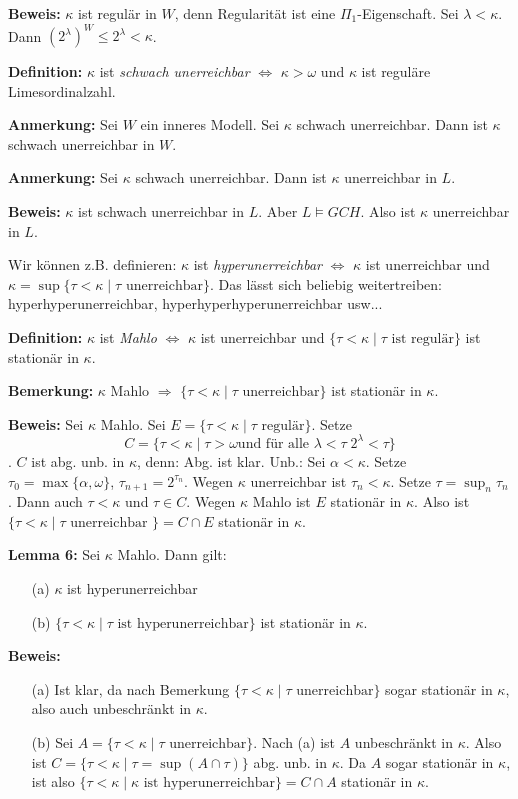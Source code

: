 \documentclass[a4paper,fontsize=11pt]{scrartcl}
\begin{document}
{\bf Beweis:} $\kappa$ ist regulär in $W$, denn Regularität ist eine
$\Pi_1$-Eigenschaft. Sei $\lambda<\kappa$. Dann $(2^{\lambda})^W\le
2^{\lambda}<\kappa$.

{\bf Definition:} $\kappa$ ist \emph{schwach unerreichbar} $\iff$
$\kappa>\omega$ und $\kappa$ ist reguläre Limesordinalzahl.

{\bf Anmerkung:} Sei $W$ ein inneres Modell. Sei $\kappa$ schwach
unerreichbar. Dann ist $\kappa$ schwach unerreichbar in $W$.

{\bf Anmerkung:} Sei $\kappa$ schwach unerreichbar. Dann ist $\kappa$ unerreichbar in $L$.

{\bf Beweis:} $\kappa$ ist schwach unerreichbar in $L$. Aber $L\models
GCH$. Also ist $\kappa$ unerreichbar in $L$.

Wir können z.B. definieren: $\kappa$ ist \emph{hyperunerreichbar}
$\iff$ $\kappa$ ist unerreichbar und $\kappa
=\sup\{\tau<\kappa\mid\tau \mbox{ unerreichbar}\}$. Das lässt sich
beliebig weitertreiben: hyperhyperunerreichbar,
hyperhyperhyperunerreichbar usw...

{\bf Definition:} $\kappa$ ist \emph{Mahlo} $\iff$ $\kappa$ ist
unerreichbar und $\{\tau<\kappa\mid \tau \mbox{ ist regulär}\}$ ist
stationär in $\kappa$.

{\bf Bemerkung:} $\kappa$ Mahlo $\Rightarrow$ $\{ \tau<\kappa\mid \tau\mbox{ unerreichbar}\}$ ist stationär in $\kappa$.

{\bf Beweis:} Sei $\kappa$ Mahlo. Sei $E= \{\tau<\kappa\mid \tau
\mbox{ regulär} \}$. Setze \[C=\{ \tau<\kappa\mid \tau>\omega \mbox{
  und für alle }\lambda<\tau\; 2^{\lambda}<\tau\}\]. $C$ ist
abg. unb. in $\kappa$, denn: Abg. ist klar.  Unb.: Sei
$\alpha<\kappa$.  Setze $\tau_0=\max\{\alpha,\omega\}$,
$\tau_{n+1}=2^{\tau_n}$.  Wegen $\kappa$ unerreichbar ist
$\tau_n<\kappa$.  Setze $\tau=\sup_n\tau_n$.  Dann auch $\tau<\kappa$
und $\tau\in C$.  Wegen $\kappa$ Mahlo ist $E$ stationär in $\kappa$.
Also ist $\{\tau<\kappa\mid \tau\mbox{ unerreichbar }\} = C\cap E$
stationär in $\kappa$.

{\bf Lemma 6:} Sei $\kappa$ Mahlo. Dann gilt: 
\begin{itemize}
\item[(a)] $\kappa$ ist hyperunerreichbar
\item[(b)] $\{\tau<\kappa\mid \tau \mbox{ ist hyperunerreichbar}\}$ ist stationär in $\kappa$.
\end{itemize}

{\bf Beweis:}
\begin{itemize}
\item[(a)] Ist klar, da nach Bemerkung $\{\tau<\kappa\mid \tau\mbox{ unerreichbar}\}$  sogar stationär in $\kappa$, also auch unbeschränkt in $\kappa$.
\item[(b)] Sei $A=\{\tau<\kappa\mid \tau \mbox{ unerreichbar}\}$. Nach
  (a) ist $A$ unbeschränkt in $\kappa$. Also ist $C=\{ \tau<\kappa\mid
  \tau=\sup(A\cap\tau)\}$ abg. unb. in $\kappa$. Da $A$ sogar
  stationär in $\kappa$, ist also $\{\tau<\kappa\mid \kappa \mbox{ ist
    hyperunerreichbar}\}=C\cap A$ stationär in $\kappa$.
\end{itemize}

\end{document}
